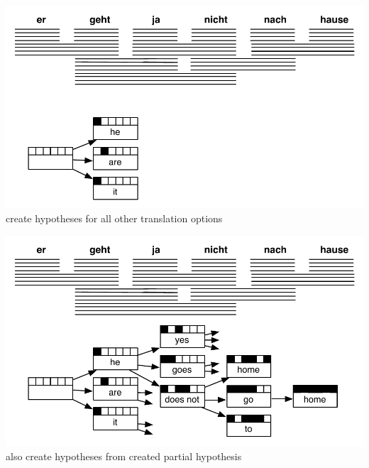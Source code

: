 \documentclass[landscape]{uedslides2C}
\begin{document}

\begin{center} 
\includegraphics[scale=1.3]{decoding-step4.pdf}\\[5mm]
create hypotheses for all other translation options
\end{center}


\begin{center} 
\includegraphics[scale=1.3]{decoding-step5.pdf}\\
also create hypotheses from created partial hypothesis
\end{center}

\end{document}
